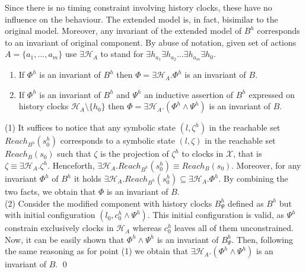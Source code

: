 \documentclass{LMCS}
\newcommand{\mycomment}[1]{}
\newcommand{\hp}{\mathcal{H}_A}
\newcommand{\X}{\mathcal{X}}
\newcommand{\reach}{\mathit{Reach}}
\newcommand{\cn}{\mathit{B}\xspace}
\newcommand{\te}{h_0}
\theoremstyle{plain}\newtheorem{remark}[thm]{Remark}
\theoremstyle{plain}\newtheorem{example}[thm]{Example}
\begin{document}
\mycomment{ In fact,
  if the history clocks were initialised to be equal to $0$ at the
  start time, the global invariant would allow to reflect that all the
  actions have occurred at instant $0$, which is generally
  spurious. In addition, in the following subsections, the method
  proposes an invariant expressing some \textit{separations} between
  the history clocks in some cases. This would induce inaccuracy if
  the history clocks are supposed all equal initially.  Following this
  reasoning, we initialised the history clocks to be strictly positive
  at start time, without giving them concrete values.  }

Since there is no timing constraint involving history clocks, these have no
influence on the behaviour. The extended model is, in fact, bisimilar to
the original model. Moreover, any invariant of the extended model of
$\cn^h$ corresponds to an invariant of original component.  By abuse of
notation, given set of actions $A = \{a_1,...,a_m\}$ use $\exists \hp$ to
stand for $\exists h_{a_1} \exists h_{a_2} \dots \exists h_{a_m} \exists
\te$.

\begin{prop} \label{p:tah} \hfill
  \begin{enumerate}
  \item If $\Phi^h$ is an invariant of $B^h$ then $\Phi = \exists \hp.
    \Phi^h$ is an invariant of $B$.
  \item If $\Phi^h$ is an invariant of $B^h$ and $\Psi^h$ an inductive
    assertion of $B^h$ expressed on history clocks $\hp \setminus \{ h_0
    \}$ then $\Phi = \exists \hp. (\Phi^h \wedge \Psi^h)$ is an invariant of $B$.
  \end{enumerate}
\end{prop}

\proof (1) It suffices to notice that any symbolic state $(l,
\zeta^h)$ in the reachable set $\reach_{\cn^h}(s_0^h)$ corresponds to
a symbolic state $(l, \zeta)$ in the reachable set $\reach_{\cn}(s_0)$
such that $\zeta$ is the projection of $\zeta^h$ to clocks in $\X$,
that is $\zeta \equiv \exists \hp. \zeta^h$.  Henceforth, $\exists
\hp.  \reach_{\cn^h}(s_0^h) \equiv \reach_{\cn}(s_0)$.  Moreover, for
any invariant $\Phi^h$ of $\cn^h$ it holds $\exists
\hp. \reach_{\cn^h}(s_0^h) \subseteq \exists \hp. \Phi^h$.  By
combining the two facts, we obtain that $\Phi$ is an invariant of
$\cn$. \\
\hspace*{1cm} (2) Consider the modified component with history clocks
$\cn^h_\Psi$ defined as $B^h$ but with initial configuration $(l_0,
c_0^h \wedge \Psi^h)$.  This initial configuration is valid, as
$\Psi^h$ constrain exclusively clocks in $\hp$ whereas $c_0^h$ leaves
all of them unconstrained.  Now, it can be easily shown that $\Phi^h
\wedge \Psi^h$ is an invariant of $\cn^h_\Psi$.  Then, following the
same reasoning as for point (1) we obtain that $\exists \hp.  (\Phi^h
\wedge \Psi^h)$ is an invariant of $\cn$.  \qed
\end{document}
